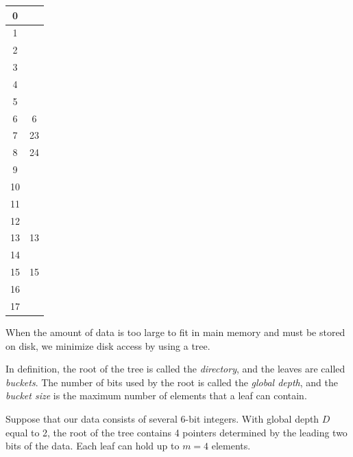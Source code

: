 \begin{minipage}{0.15\textwidth}
\begin{table}[H]
  \centering
  \begin{tabular}{|c|c|}
    \hline
      0 &  \\ \hline
      1 &  \\ \hline
      2 &  \\ \hline
      3 &  \\ \hline
      4 &  \\ \hline
      5 &  \\ \hline
      6 & 6 \\ \hline
      7 & 23 \\ \hline
      8 & 24 \\ \hline
      9 &  \\ \hline
      10 &  \\ \hline
      11 &  \\ \hline
      12 &  \\ \hline
      13 & 13 \\ \hline
      14 &  \\ \hline
      15 & 15 \\ \hline
      16 &  \\ \hline
      17 &  \\ \hline
  \end{tabular}
\end{table}
\end{minipage}

When the amount of data is too large to fit in main memory and must be stored on disk, we minimize disk access by using a tree. 

In definition, the root of the tree is called the \textit{directory}, and the leaves are called \textit{buckets}. The number of bits used by the root is called the \textit{global depth}, and the \textit{bucket size} is the maximum number of elements that a leaf can contain. 

Suppose that our data consists of several 6-bit integers. With global depth \(D\) equal to 2, the root of the tree contains 4 pointers determined by the leading two bits of the data. Each leaf can hold up to \(m = 4\) elements.

